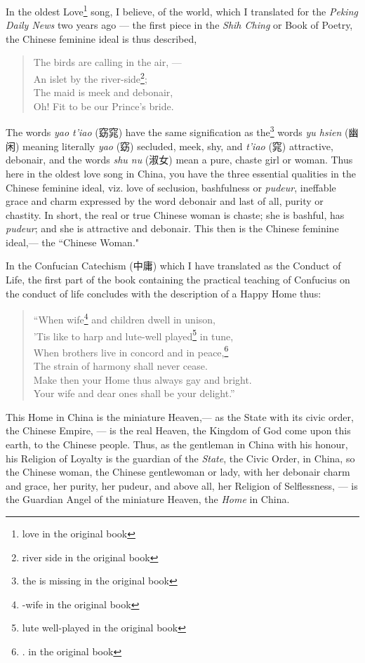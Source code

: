 In the oldest Love\footnote{love in the original book} song, I believe, of the world, which I translated for the \emph{Peking Daily News} two years ago --- the first piece in the \emph{Shih Ching} or Book of Poetry, the Chinese feminine ideal is thus described,
\begin{quote}\footnotesize
   The birds are calling in the air, ---\\
   An islet by the river-side\footnote{river side in the original book};\\
   The maid is meek and debonair,\\
   Oh! Fit to be our Prince's bride.\\
\end{quote}

The words \emph{yao t'iao} (窈窕) have the same signification as the\footnote{the is missing in the original book} words \emph{yu hsien} (幽闲) meaning literally \emph{yao} (窈) secluded, meek, shy, and \emph{t'iao} (窕) attractive, debonair, and the words \emph{shu nu} (淑女) mean a pure, chaste girl or woman.
Thus here in the oldest love song in China, you have the three essential qualities in the Chinese feminine ideal, viz. love of seclusion, bashfulness or \emph{pudeur}, ineffable grace and charm expressed by the word debonair and last of all, purity or chastity.
In short, the real or true Chinese woman is chaste; she is bashful, has \emph{pudeur}; and she is attractive and debonair.
This then is the Chinese feminine ideal,--- the ``Chinese Woman."

In the Confucian Catechism (中庸) which I have translated as the Conduct of Life, the first part of the book containing the practical teaching of Confucius on the conduct of life concludes with the description of a Happy Home thus:
\begin{quote}\footnotesize
    ``When wife\footnote{-wife in the original book} and children dwell in unison,\\
    'Tis like to harp and lute-well played\footnote{lute well-played in the original book} in tune,\\
    When brothers live in concord and in peace,\footnote{. in the original book}\\
   The strain of harmony shall never cease.\\
   Make then your Home thus always gay and bright.\\
   Your wife and dear ones shall be your delight.''\\
\end{quote}
This Home in China is the miniature Heaven,--- as the State with its civic order, the Chinese Empire, --- is the real Heaven, the Kingdom of God come upon this earth, to the Chinese people.
Thus, as the gentleman in China with his honour, his Religion of Loyalty is the guardian of the \emph{State}, the Civic Order, in China, so the Chinese woman, the Chinese gentlewoman or lady, with her debonair charm and grace, her purity, her pudeur, and above all, her Religion of Selflessness, --- is the Guardian Angel of the miniature Heaven, the \emph{Home} in China.         

